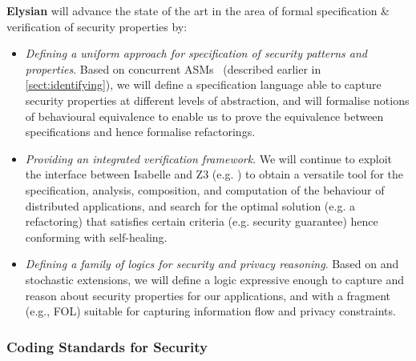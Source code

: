 \documentclass[a4paper,11pt]{article}
\newcommand{\project}[1]{\textbf{#1}\xspace}
\newcommand{\SECURITY}{\project{Elysian}}
\newcommand{\TheProject}{\SECURITY}
\begin{document}
\begin{mdframed}[backgroundcolor=gray!10]
\TheProject{} will advance the state of the art in the area of formal specification \& verification of security properties by:
\begin{itemize}
\item \emph{Defining a uniform approach for specification of security patterns and properties}. Based on concurrent ASMs~\cite{BorgerS16} (described earlier in \ref{sect:identifying}), we will
define a specification language able to capture security properties at different levels of abstraction, and will formalise notions of behavioural equivalence to enable us to prove the equivalence between specifications and hence formalise refactorings.

\item \emph{Providing an integrated verification framework}. We will continue to  exploit the interface between Isabelle and Z3 (e.g. \cite{BowCam2020}) to obtain a versatile tool for the specification, analysis, composition, and computation of the behaviour of distributed applications, and search for the optimal solution (e.g. a refactoring) that satisfies certain criteria (e.g. security guarantee) 
hence conforming with self-healing.
\item \emph{Defining a family of logics for security and privacy reasoning}. Based on {} and stochastic extensions, we will define a logic expressive enough to capture and reason about security properties for our applications, and with a  fragment (e.g., FOL) suitable for capturing
information flow and privacy constraints. %
\end{itemize}
\end{mdframed}

\subsubsection{Coding Standards for Security}
\label{sect:codingStandards}
\end{document}
